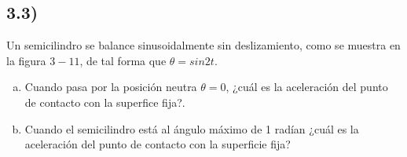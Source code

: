 \documentclass{article}
\begin{document}
\subsection*{3.3)}
Un semicilindro se balance sinusoidalmente sin deslizamiento, como se muestra en la figura 
$3-11$, de tal forma que $\theta = sin2t$. 
\begin{enumerate}[a)]
    \item Cuando pasa por la posición neutra $\theta=0$, ¿cuál es la aceleración del punto
    de contacto con la superfice fija?. 
    \item Cuando el semicilindro está al ángulo máximo de 1 radían ¿cuál es la aceleración 
    del punto de contacto con la superficie fija?
\end{enumerate}
\begin{tcolorbox}[breakable]
    
\end{tcolorbox}
\end{document}
